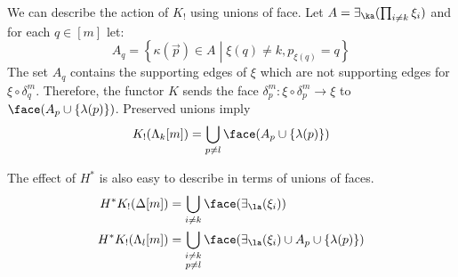 \documentclass{amsart}
\theoremstyle{plain}
\theoremstyle{definition}
\newcommand\hide[1]{}
\newcommand\set[1]{\left\{#1\right\}}
\newcommand\ri{^*}
\begin{document}
We can describe the action of $K_!$ using unions of face. Let $A = \im\ka(\prod_{i\neq k}\xi_i)$ and for each $q\in[m]$ let:
\[ A_q = \set{\kappa(\vec p)\in A\middle|\hide{\vec p\in\prod_{i\neq k}\xi_i,} \xi(q) \neq k, p_{\xi(q)}=q } \]
The set $A_q$ contains the supporting edges of $\xi$ which are not supporting edges for $\xi\circ\delta^m_q$. Therefore, the functor $K$ sends the face $\delta^m_p:\xi\circ\delta^m_p \to \xi$ to $\face(A_p\cup\set{\lambda(p)})$. Preserved unions imply
\[ K_!(\Lambda_k[m]) = \bigcup_{p\neq l} \face(A_p\cup\set{\lambda(p)})\]

The effect of $H\ri$ is also easy to describe in terms of unions of faces.
\begin{align*}
H\ri K_!(\Delta[m]) &= \bigcup_{i\neq k} \face(\im\la(\xi_i)) \\
H\ri K_!(\Lambda_l[m]) &= \bigcup_{\substack{i\neq k\\p\neq l}} \face(\im\la(\xi_i)\cup A_p\cup\set{\lambda(p)}) %
\end{align*}
 
\end{document}
